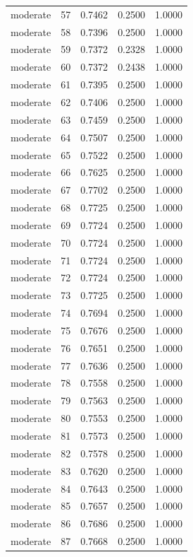 \begin{tabular}{lrrrr}
moderate & 57 & 0.7462 & 0.2500 & 1.0000 \\
moderate & 58 & 0.7396 & 0.2500 & 1.0000 \\
moderate & 59 & 0.7372 & 0.2328 & 1.0000 \\
moderate & 60 & 0.7372 & 0.2438 & 1.0000 \\
moderate & 61 & 0.7395 & 0.2500 & 1.0000 \\
moderate & 62 & 0.7406 & 0.2500 & 1.0000 \\
moderate & 63 & 0.7459 & 0.2500 & 1.0000 \\
moderate & 64 & 0.7507 & 0.2500 & 1.0000 \\
moderate & 65 & 0.7522 & 0.2500 & 1.0000 \\
moderate & 66 & 0.7625 & 0.2500 & 1.0000 \\
moderate & 67 & 0.7702 & 0.2500 & 1.0000 \\
moderate & 68 & 0.7725 & 0.2500 & 1.0000 \\
moderate & 69 & 0.7724 & 0.2500 & 1.0000 \\
moderate & 70 & 0.7724 & 0.2500 & 1.0000 \\
moderate & 71 & 0.7724 & 0.2500 & 1.0000 \\
moderate & 72 & 0.7724 & 0.2500 & 1.0000 \\
moderate & 73 & 0.7725 & 0.2500 & 1.0000 \\
moderate & 74 & 0.7694 & 0.2500 & 1.0000 \\
moderate & 75 & 0.7676 & 0.2500 & 1.0000 \\
moderate & 76 & 0.7651 & 0.2500 & 1.0000 \\
moderate & 77 & 0.7636 & 0.2500 & 1.0000 \\
moderate & 78 & 0.7558 & 0.2500 & 1.0000 \\
moderate & 79 & 0.7563 & 0.2500 & 1.0000 \\
moderate & 80 & 0.7553 & 0.2500 & 1.0000 \\
moderate & 81 & 0.7573 & 0.2500 & 1.0000 \\
moderate & 82 & 0.7578 & 0.2500 & 1.0000 \\
moderate & 83 & 0.7620 & 0.2500 & 1.0000 \\
moderate & 84 & 0.7643 & 0.2500 & 1.0000 \\
moderate & 85 & 0.7657 & 0.2500 & 1.0000 \\
moderate & 86 & 0.7686 & 0.2500 & 1.0000 \\
moderate & 87 & 0.7668 & 0.2500 & 1.0000 \\

\end{tabular}
